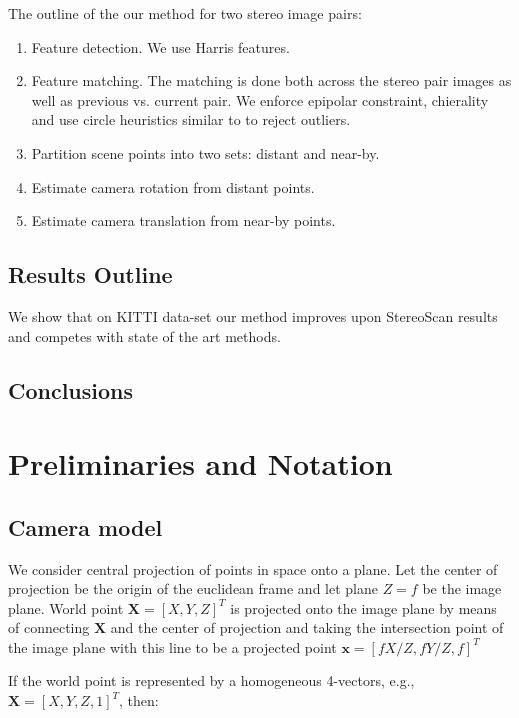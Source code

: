 \documentclass[runningheads]{llncs}
\begin{document}
The outline of the our method for two stereo image pairs:
\begin{enumerate}
\item Feature detection.  We use Harris \cite{Harris1987} features.
\item Feature matching. The matching is done both across the stereo
  pair images as well as previous vs. current pair.  We enforce
  epipolar constraint, chierality and use circle heuristics similar to
  \cite{Geiger2011} to reject outliers.
\item Partition scene points into two sets: distant and near-by.
\item Estimate camera rotation from distant points.
\item Estimate camera translation from near-by points.
\end{enumerate}

\subsection{Results Outline}

We show that on KITTI data-set our method improves upon StereoScan\cite{Geiger2011}
results and competes with state of the art methods.

\subsection{Conclusions}

\section{Preliminaries and Notation}

\subsection{Camera model}

We consider central projection of points in space onto a plane. Let
the center of projection be the origin of the euclidean frame and let
plane $Z=f$ be the image plane. World point $\mathbf{X}=[X,Y,Z]^T$ is
projected onto the image plane by means of connecting $\mathbf{X}$ and
the center of projection and taking the intersection point of the
image plane with this line to be a projected point
$\mathbf{x}=[fX/Z,fY/Z,f]^T$


If the world point is represented by a homogeneous 4-vectors, e.g.,
$\mathbf{X} = [X,Y,Z,1]^T$, then:
\end{document}
